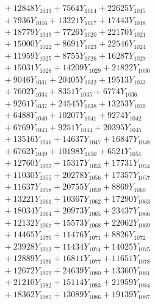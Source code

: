 \documentclass[a4paper,10pt]{article}
\begin{document}
{\begin{align}
&\;  + 12848 Y_{1013} + 7564 Y_{1014} + 22625 Y_{1015} \\[0.3ex]
&\;  + 7936 Y_{1016} + 13221 Y_{1017} + 17443 Y_{1018} \\[0.5ex]\allowbreak
&\;  + 18779 Y_{1019} + 7726 Y_{1020} + 22170 Y_{1021} \\[0.3ex]
&\;  + 15000 Y_{1022} + 8691 Y_{1023} + 22546 Y_{1024} \\[0.3ex]
&\;  + 11959 Y_{1025} + 8755 Y_{1026} + 16287 Y_{1027} \\[0.3ex]
&\;  + 15031 Y_{1028} + 14209 Y_{1029} + 21822 Y_{1030} \\[0.3ex]
&\;  + 9046 Y_{1031} + 20405 Y_{1032} + 19513 Y_{1033} \\[0.3ex]
&\;  + 7602 Y_{1034} + 8351 Y_{1035} + 6774 Y_{1036} \\[0.3ex]
&\;  + 9261 Y_{1037} + 24545 Y_{1038} + 13253 Y_{1039} \\[0.3ex]
&\;  + 6488 Y_{1040} + 10207 Y_{1041} + 9274 Y_{1042} \\[0.3ex]
&\;  + 6769 Y_{1043} + 9251 Y_{1044} + 20395 Y_{1045} \\[0.3ex]
&\;  + 13516 Y_{1046} + 14637 Y_{1047} + 16847 Y_{1048} \\[0.5ex]\allowbreak
&\;  + 6762 Y_{1049} + 10198 Y_{1050} + 6521 Y_{1051} \\[0.3ex]
&\;  + 12760 Y_{1052} + 15317 Y_{1053} + 17731 Y_{1054} \\[0.3ex]
&\;  + 11030 Y_{1055} + 20278 Y_{1056} + 17357 Y_{1057} \\[0.3ex]
&\;  + 11637 Y_{1058} + 20755 Y_{1059} + 8869 Y_{1060} \\[0.3ex]
&\;  + 13221 Y_{1061} + 10367 Y_{1062} + 17290 Y_{1063} \\[0.3ex]
&\;  + 18034 Y_{1064} + 20973 Y_{1065} + 23437 Y_{1066} \\[0.3ex]
&\;  + 12132 Y_{1067} + 15573 Y_{1068} + 22062 Y_{1069} \\[0.3ex]
&\;  + 14465 Y_{1070} + 11476 Y_{1071} + 8826 Y_{1072} \\[0.3ex]
&\;  + 23928 Y_{1073} + 11434 Y_{1074} + 14025 Y_{1075} \\[0.3ex]
&\;  + 12889 Y_{1076} + 16811 Y_{1077} + 11651 Y_{1078} \\[0.5ex]\allowbreak
&\;  + 12672 Y_{1079} + 24639 Y_{1080} + 13360 Y_{1081} \\[0.3ex]
&\;  + 21210 Y_{1082} + 15114 Y_{1083} + 21959 Y_{1084} \\[0.3ex]
&\;  + 18362 Y_{1085} + 13089 Y_{1086} + 19139 Y_{1087} \\[0.3ex]

\end{align}}
\end{document}

